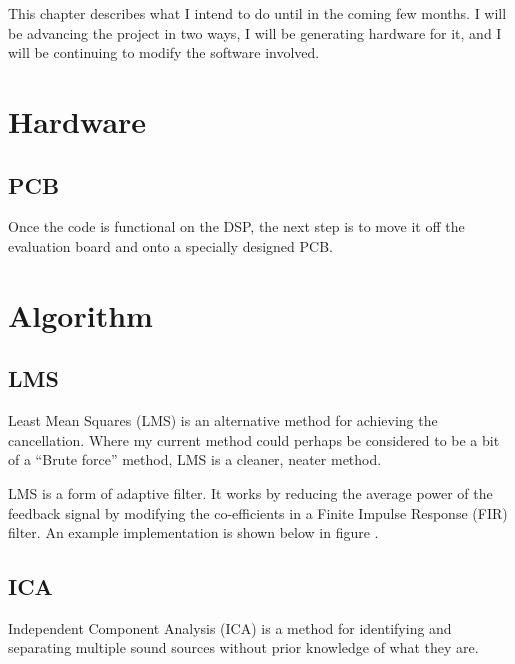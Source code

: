 This chapter describes what I intend to do until in the coming few months.
I will be advancing the project in two ways, I will be generating hardware for it, and I will be continuing to modify the software involved.

\section{Hardware}
\subsection{PCB}
Once the code is functional on the DSP, the next step is to move it off the evaluation board and onto a specially designed PCB.

\section{Algorithm}
\subsection{LMS}
Least Mean Squares (LMS) is an alternative method for achieving the cancellation.
Where my current method could perhaps be considered to be a bit of a ``Brute force'' method, LMS is a cleaner, neater method.

LMS is a form of adaptive filter.
It works by reducing the average power of the feedback signal by modifying the co-efficients in a Finite Impulse Response (FIR) filter.
An example implementation is shown below in figure .

\subsection{ICA}
Independent Component Analysis (ICA) is a method for identifying and separating multiple sound sources without prior knowledge of what they are.
